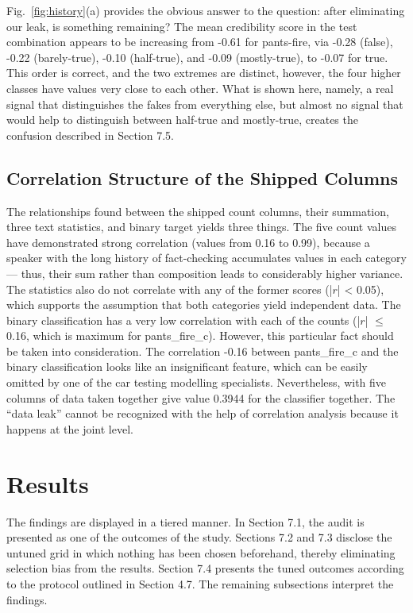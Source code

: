 \documentclass[10pt,twocolumn,twoside,a4paper]{article}
\begin{document}
Fig.~\ref{fig:history}(a) provides the obvious answer to the question: after eliminating our leak, is something remaining? The mean credibility score in the test combination appears to be increasing from -0.61 for pants-fire, via -0.28 (false), -0.22 (barely-true), -0.10 (half-true), and -0.09 (mostly-true), to -0.07 for true. This order is correct, and the two extremes are distinct, however, the four higher classes have values very close to each other. What is shown here, namely, a real signal that distinguishes the fakes from everything else, but almost no signal that would help to distinguish between half-true and mostly-true, creates the confusion described in Section 7.5.

\subsection{Correlation Structure of the Shipped Columns}

The relationships found between the shipped count columns, their summation, three text statistics, and binary target yields three things. The five count values have demonstrated strong correlation (values from 0.16 to 0.99), because a speaker with the long history of fact-checking accumulates values in each category --- thus, their sum rather than composition leads to considerably higher variance. The statistics also do not correlate with any of the former scores (|$r$| < 0.05), which supports the assumption that both categories yield independent data. The binary classification has a very low correlation with each of the counts (|$r$| $\le$ 0.16, which is maximum for pants\_fire\_c). However, this particular fact should be taken into consideration. The correlation -0.16 between pants\_fire\_c and the binary classification looks like an insignificant feature, which can be easily omitted by one of the car testing modelling specialists. Nevertheless, with five columns of data taken together give value 0.3944 for the classifier together. The ``data leak'' cannot be recognized with the help of correlation analysis because it happens at the joint level.

\section{Results}

The findings are displayed in a tiered manner. In Section 7.1, the audit is presented as one of the outcomes of the study. Sections 7.2 and 7.3 disclose the untuned grid in which nothing has been chosen beforehand, thereby eliminating selection bias from the results. Section 7.4 presents the tuned outcomes according to the protocol outlined in Section 4.7. The remaining subsections interpret the findings.
\end{document}
